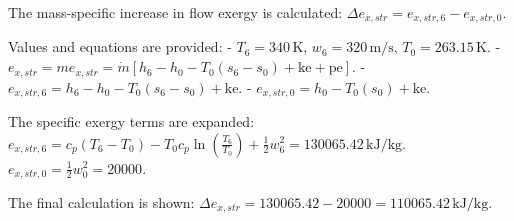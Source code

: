 The mass-specific increase in flow exergy is calculated:  
\( \Delta e_{x,str} = e_{x,str,6} - e_{x,str,0} \).  

Values and equations are provided:  
- \( T_6 = 340 \, \text{K} \), \( w_6 = 320 \, \text{m/s} \), \( T_0 = 263.15 \, \text{K} \).  
- \( e_{x,str} = m e_{x,str} = \dot{m} \left[ h_6 - h_0 - T_0 (s_6 - s_0) + \text{ke} + \text{pe} \right] \).  
- \( e_{x,str,6} = h_6 - h_0 - T_0 (s_6 - s_0) + \text{ke} \).  
- \( e_{x,str,0} = h_0 - T_0 (s_0) + \text{ke} \).  

The specific exergy terms are expanded:  
\( e_{x,str,6} = c_p (T_6 - T_0) - T_0 c_p \ln \left( \frac{T_6}{T_0} \right) + \frac{1}{2} w_6^2 = 130065.42 \, \text{kJ/kg} \).  
\( e_{x,str,0} = \frac{1}{2} w_0^2 = 20000 \).  

The final calculation is shown:  
\( \Delta e_{x,str} = 130065.42 - 20000 = 110065.42 \, \text{kJ/kg} \).